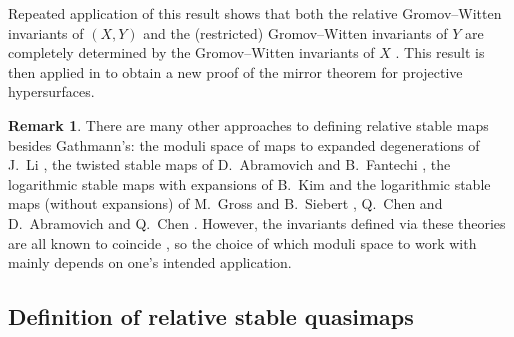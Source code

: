 \documentclass[11pt]{amsart}
\theoremstyle{definition}
\theoremstyle{definition}
\newtheorem{remark}[thm]{Remark}
\begin{document}
Repeated application of this result shows that both the relative Gromov--Witten invariants of $(X,Y)$ and the (restricted) Gromov--Witten invariants of $Y$ are completely determined by the Gromov--Witten invariants of $X$ \cite[Corollary 5.7]{Ga}. This result is then applied in \cite{Ga-MF} to obtain a new proof of the mirror theorem for projective hypersurfaces.

\begin{remark} There are many other approaches to defining relative stable maps besides Gathmann's: the moduli space of maps to expanded degenerations of J.~Li \cite{Li1} \cite{Li2}, the twisted stable maps of D.~Abramovich and B.~Fantechi \cite{AbramovichFantechi}, the logarithmic stable maps with expansions of B.~Kim \cite{KimLog} and the logarithmic stable maps (without expansions) of M.~Gross and B.~Siebert \cite{GrossSiebertLog}, Q.~Chen \cite{ChenLog} and D.~Abramovich and Q.~Chen \cite{AbramovichChenLog}. However, the invariants defined via these theories are all known to coincide \cite{AbramovichMarcusWiseComparison} \cite{GathmannThesis}, so the choice of which moduli space to work with mainly depends on one's intended application. \end{remark}

\subsection{Definition of relative stable quasimaps} \label{Subsection relative stable quasimaps}
\end{document}
